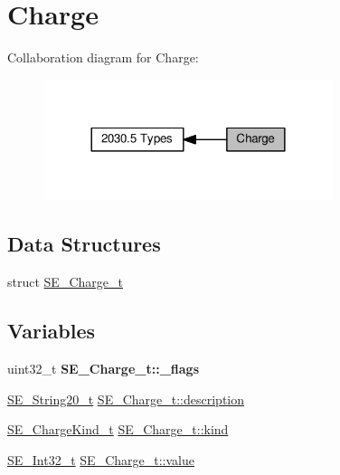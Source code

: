 \hypertarget{group__Charge}{}\section{Charge}
\label{group__Charge}
Collaboration diagram for Charge\+:\nopagebreak
\begin{figure}[H]
\begin{center}
\leavevmode
\includegraphics[width=240pt]{group__Charge}
\end{center}
\end{figure}
\subsection*{Data Structures}
\begin{DoxyCompactItemize}
\item 
struct \hyperlink{structSE__Charge__t}{S\+E\+\_\+\+Charge\+\_\+t}
\end{DoxyCompactItemize}
\subsection*{Variables}
\begin{DoxyCompactItemize}
\item 
\mbox{\label{group__Charge_gaf81ed6694187623f02067a29595ed4c2}} 
uint32\+\_\+t {\bfseries S\+E\+\_\+\+Charge\+\_\+t\+::\+\_\+flags}
\item 
\hyperlink{group__String20_gac62354528eb48096f8deab6e503a3193}{S\+E\+\_\+\+String20\+\_\+t} \hyperlink{group__Charge_gaf71b9ce21de6c7acc90259e2ead7523b}{S\+E\+\_\+\+Charge\+\_\+t\+::description}
\item 
\hyperlink{group__ChargeKind_gac33236bd52e13aede011017e581420b8}{S\+E\+\_\+\+Charge\+Kind\+\_\+t} \hyperlink{group__Charge_gaa4b5e0563a6399b45d450cd7140d6404}{S\+E\+\_\+\+Charge\+\_\+t\+::kind}
\item 
\hyperlink{group__Int32_gaa7afc819cfc8033c5fa408e34da8b71a}{S\+E\+\_\+\+Int32\+\_\+t} \hyperlink{group__Charge_gaeaac7d57d7b8c24acd4edd955b84f618}{S\+E\+\_\+\+Charge\+\_\+t\+::value}
\end{DoxyCompactItemize}


